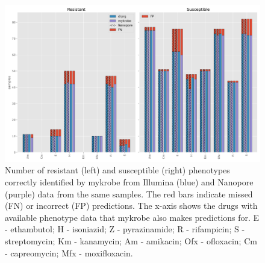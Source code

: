 \begin{figure}
\begin{center}
\includegraphics[width=0.90\columnwidth]{Chapter3/Figs/phenotype_concordance.png}
\caption{{Number of resistant (left) and susceptible (right) phenotypes correctly identified by mykrobe from Illumina (blue) and Nanopore (purple) data from the same samples. The red bars indicate missed (FN) or incorrect (FP) predictions. The x-axis shows the drugs with available phenotype data that mykrobe also makes predictions for. E - ethambutol; H - isoniazid; Z - pyrazinamide; R - rifampicin; S - streptomycin; Km - kanamycin; Am - amikacin; Ofx - ofloxacin; Cm - capreomycin; Mfx - moxifloxacin.
{\label{fig:pheno-concordance}}
}}
\end{center}
\end{figure}

